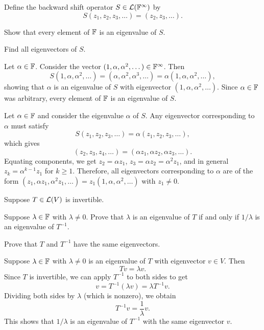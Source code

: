 \begin{exc}
\begin{exercise}
Define the backward shift operator $S\in\mathcal{L}(\mathbb{F}^\infty)$ by
\[ S(z_1,z_2,z_3,\dots) = (z_2,z_3,\dots). \]
\begin{parts}
\item Show that every element of $\mathbb{F}$ is an eigenvalue of $S$.
\item Find all eigenvectors of $S$.
\end{parts}
\end{exercise}
\begin{solution}
\begin{parts}
\item Let $\alpha\in\mathbb{F}$. Consider the vector $(1,\alpha,\alpha^2,\dots)\in
  \mathbb{F}^\infty$. Then
  \[ S(1,\alpha,\alpha^2,\dots) = (\alpha,\alpha^2,\alpha^3,\dots)
     = \alpha(1,\alpha,\alpha^2,\dots), \]
  showing that $\alpha$ is an eigenvalue of $S$ with eigenvector
  $(1,\alpha,\alpha^2,\dots)$. Since $\alpha\in\mathbb{F}$ was arbitrary, every
  element of $\mathbb{F}$ is an eigenvalue of $S$.
\item Let $\alpha\in\mathbb{F}$ and consider the eigenvalue $\alpha$ of $S$. Any
  eigenvector corresponding to $\alpha$ must satisfy
  \[ S(z_1,z_2,z_3,\dots) = \alpha(z_1,z_2,z_3,\dots), \]
  which gives
  \[ (z_2,z_3,z_4,\dots) = (\alpha z_1,\alpha z_2,\alpha z_3,\dots). \]
  Equating components, we get $z_2=\alpha z_1$,
  $z_3=\alpha z_2=\alpha^2z_1$, and in general $z_k=\alpha^{k-1}z_1$ for
  $k\ge1$. Therefore, all eigenvectors corresponding to $\alpha$ are of the
  form
  $(z_1,\alpha z_1,\alpha^2z_1,\dots)=z_1(1,\alpha,\alpha^2,\dots)$ with
  $z_1\ne0$. \qedhere
\end{parts}
\end{solution}

\begin{exercise}
Suppose $T\in\mathcal{L}(V)$ is invertible.
\begin{parts}
\item Suppose $\lambda\in\mathbb{F}$ with $\lambda\ne0$. Prove that $\lambda$ is an
  eigenvalue of $T$ if and only if $1/\lambda$ is an eigenvalue of
  $T^{-1}$.
\item Prove that $T$ and $T^{-1}$ have the same eigenvectors.
\end{parts}
\end{exercise}
\begin{solution}
\begin{parts}
\item Suppose $\lambda\in\mathbb{F}$ with $\lambda\ne0$ is an eigenvalue of $T$ with
  eigenvector $v\in V$. Then
  \[ Tv = \lambda v. \]
  Since $T$ is invertible, we can apply $T^{-1}$ to both sides to get
  \[ v = T^{-1}(\lambda v) = \lambda T^{-1}v. \]
  Dividing both sides by $\lambda$ (which is nonzero), we obtain
  \[ T^{-1}v = \frac{1}{\lambda}v. \]
  This shows that $1/\lambda$ is an eigenvalue of $T^{-1}$ with the
  same eigenvector $v$.


\end{parts}
\end{solution}
\end{exc}

